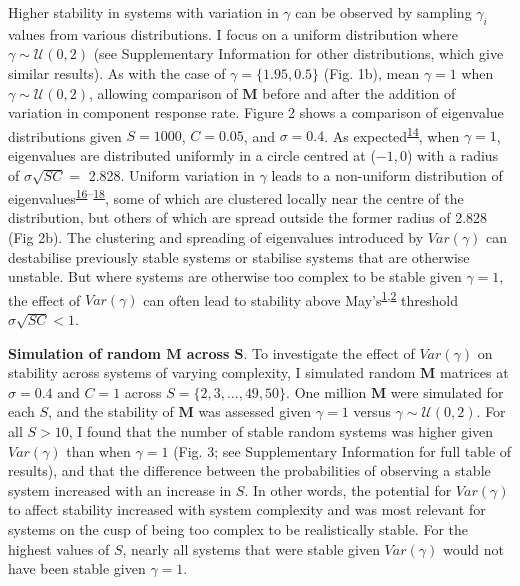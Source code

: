 \documentclass[]{article}
\begin{document}
Higher stability in systems with variation in \(\gamma\) can be observed
by sampling \(\gamma_{i}\) values from various distributions. I focus on
a uniform distribution where \(\gamma \sim \mathcal{U}(0, 2)\) (see
Supplementary Information for other distributions, which give similar
results). As with the case of \(\gamma = \{1.95, 0.5\}\) (Fig. 1b), mean
\(\gamma = 1\) when \(\gamma \sim \mathcal{U}(0, 2)\), allowing
comparison of \(\mathbf{M}\) before and after the addition of variation
in component response rate. Figure 2 shows a comparison of eigenvalue
distributions given \(S = 1000\), \(C = 0.05\), and \(\sigma = 0.4\). As
expected\textsuperscript{\protect\hyperlink{ref-Tao2010}{14}}, when
\(\gamma = 1\), eigenvalues are distributed uniformly in a circle
centred at (\(-1, 0\)) with a radius of \(\sigma\sqrt{SC} =\) 2.828.
Uniform variation in \(\gamma\) leads to a non-uniform distribution of
eigenvalues\textsuperscript{\protect\hyperlink{ref-Ahmadian2015}{16}--\protect\hyperlink{ref-Stone2017}{18}},
some of which are clustered locally near the centre of the distribution,
but others of which are spread outside the former radius of 2.828 (Fig
2b). The clustering and spreading of eigenvalues introduced by
\(Var(\gamma)\) can destabilise previously stable systems or stabilise
systems that are otherwise unstable. But where systems are otherwise too
complex to be stable given \(\gamma = 1\), the effect of \(Var(\gamma)\)
can often lead to stability above
May's\textsuperscript{\protect\hyperlink{ref-May1972}{1},\protect\hyperlink{ref-Allesina2012}{2}}
threshold \(\sigma\sqrt{SC} < 1\).

\textbf{Simulation of random \(\mathbf{M}\) across \(\mathbf{S}\)}. To
investigate the effect of \(Var(\gamma)\) on stability across systems of
varying complexity, I simulated random \(\mathbf{M}\) matrices at
\(\sigma = 0.4\) and \(C = 1\) across \(S = \{2, 3, ..., 49, 50\}\). One
million \(\mathbf{M}\) were simulated for each \(S\), and the stability
of \(\mathbf{M}\) was assessed given \(\gamma = 1\) versus
\(\gamma \sim \mathcal{U}(0, 2)\). For all \(S > 10\), I found that the
number of stable random systems was higher given \(Var(\gamma)\) than
when \(\gamma = 1\) (Fig. 3; see Supplementary Information for full
table of results), and that the difference between the probabilities of
observing a stable system increased with an increase in \(S\). In other
words, the potential for \(Var(\gamma)\) to affect stability increased
with system complexity and was most relevant for systems on the cusp of
being too complex to be realistically stable. For the highest values of
\(S\), nearly all systems that were stable given \(Var(\gamma)\) would
not have been stable given \(\gamma = 1\).
\end{document}
